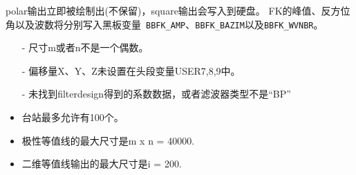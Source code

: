polar输出立即被绘制出(不保留)，square输出会写入到硬盘。
FK的峰值、反方位角以及波数将分别写入黑板变量~\verb+BBFK_AMP+、\verb+BBFK_BAZIM+以及\verb+BBFK_WVNBR+。

\begin{itemize}
\item[-]尺寸m或者n不是一个偶数。
\item[-]偏移量X、Y、Z未设置在头段变量USER7,8,9中。
\item[-]未找到filterdesign得到的系数数据，或者滤波器类型不是``BP''
\end{itemize}

\begin{itemize}
\item 台站最多允许有100个。
\item 极性等值线的最大尺寸是m x n = 40000.
\item 二维等值线输出的最大尺寸是i = 200.
\end{itemize}

